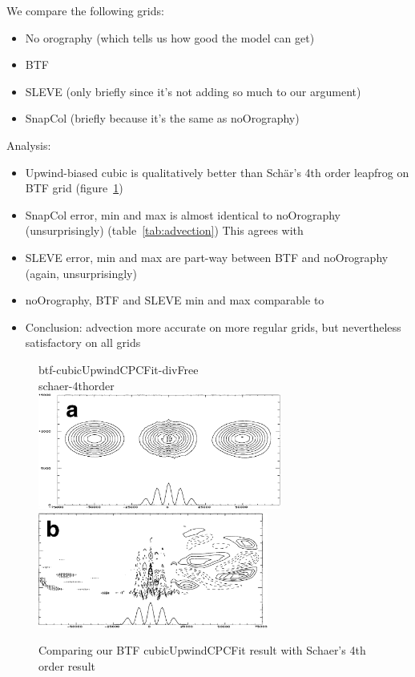 \documentclass[a4paper]{article}
\begin{document}
We compare the following grids:
\begin{itemize}
	\item No orography (which tells us how good the model can get)
	\item BTF
	\item SLEVE (only briefly since it's not adding so much to our argument)
	\item SnapCol (briefly because it's the same as noOrography)
\end{itemize}

Analysis:
\begin{itemize}
	\item Upwind-biased cubic is qualitatively better than Sch\"ar's 4th order leapfrog on BTF grid (figure~\ref{fig:advection})
	\item SnapCol error, min and max is almost identical to noOrography (unsurprisingly) (table~\ref{tab:advection})  This agrees with \textcite{good2014}
	\item SLEVE error, min and max are part-way between BTF and noOrography (again, unsurprisingly)
	\item noOrography, BTF and SLEVE min and max comparable to \textcite{schaer2002}
	\item Conclusion: advection more accurate on more regular grids, but nevertheless satisfactory on all grids
\end{itemize}

\begin{figure}
	btf-cubicUpwindCPCFit-divFree \\
	
	

	schaer-4thorder \\
	\includegraphics[height=1.5in]{schaer-btf-4thorder.png}
	\includegraphics[height=1.5in]{schaer-btf-4thorder-error.png}
%
	\caption{Comparing our BTF cubicUpwindCPCFit result with Schaer's 4th order result}
	\label{fig:advection}
\end{figure}
\end{document}
